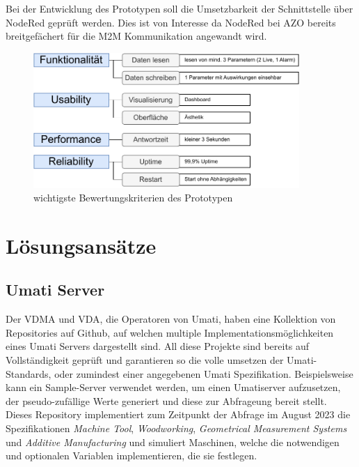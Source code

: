 \documentclass[a4paper, 12pt, oneside]{scrbook}
\begin{document}
		Bei der Entwicklung des Prototypen soll die Umsetzbarkeit der Schnittstelle über NodeRed geprüft werden. Dies ist von Interesse da NodeRed bei AZO bereits breitgefächert für die M2M Kommunikation angewandt wird. %
		
		\begin{figure}[H]
			\centering
			\includegraphics[width=0.9\textwidth]{res/analysen/Evaluation.pdf}
			\caption{wichtigste Bewertungskriterien des Prototypen}
			\label{fig:evaluation}
		\end{figure}
		
	
	\section{Lösungsansätze}
	
		\subsection{Umati Server}
		
		Der VDMA und VDA, die Operatoren von Umati, haben eine Kollektion von Repositories auf Github, auf welchen multiple Implementationsmöglichkeiten eines Umati Servers dargestellt sind. \cite{noauthor_github_nodate} All diese Projekte sind bereits auf Vollständigkeit geprüft und garantieren so die volle umsetzen der Umati-Standards, oder zumindest einer angegebenen Umati Spezifikation. Beispielsweise kann ein Sample-Server verwendet werden, um einen Umatiserver aufzusetzen, der pseudo-zufällige Werte generiert und diese zur Abfrageung bereit stellt. Dieses Repository implementiert zum Zeitpunkt der Abfrage im August 2023 die Spezifikationen \textit{Machine Tool}, \textit{Woodworking}, \textit{Geometrical Measurement Systems} und \textit{Additive Manufacturing} und simuliert Maschinen, welche die notwendigen und optionalen Variablen implementieren, die sie festlegen.
		
\end{document}
